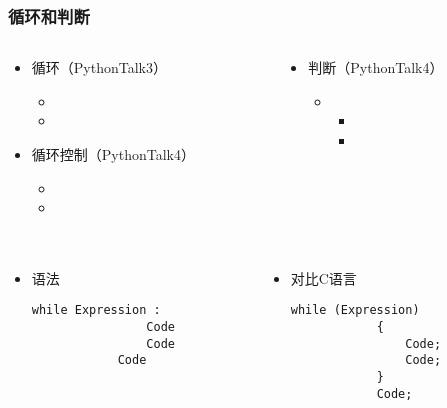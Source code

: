 \begin{CJK}{UTF8}{gbsn}
\begin{frame} [fragile]
	\frametitle{循环和判断}
	\linespread{2}
	\begin{columns}[T]
		\begin{column}[T]{.5\textwidth}
			\begin{itemize}
			\item 循环（PythonTalk3）
				\begin{itemize}
				\item {}
				\item {}
				\end{itemize}
			\item 循环控制（PythonTalk4）
				\begin{itemize}
				\item {}
				\item {}
				\end{itemize}
			\end{itemize}
		\end{column}
		\begin{column}[T]{.5\textwidth}
			\begin{itemize}
			\item 判断（PythonTalk4）
				\begin{itemize}
				\item {}
					\begin{itemize}
					\item {}
					\item {}
					\end{itemize}
				\end{itemize}
			\end{itemize}
		\end{column}
	\end{columns}
\end{frame}

\begin{frame} [fragile]
	\frametitle{}
	\linespread{1.5}
	\begin{columns}[T]
		\begin{column}[T]{.5\textwidth}
			\begin{itemize}
			\item 语法
			\begin{lstlisting}[style=pythonstyle, gobble=12]
			while Expression :
				Code
				Code
			Code
			\end{lstlisting}
			\end{itemize}
		\end{column}
		\begin{column}[T]{.5\textwidth}
			\begin{itemize}
			\item 对比C语言
			\begin{lstlisting}[style=cstyle, gobble=12]
			while (Expression)
			{
				Code;
				Code;
			}
			Code;
			\end{lstlisting}
			\end{itemize}
		\end{column}
	\end{columns}
\end{frame}


\end{CJK}
